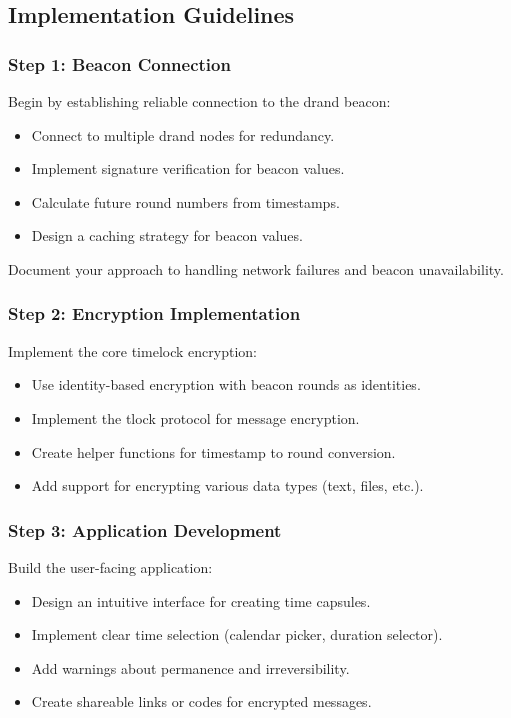 \documentclass[10pt,a4paper,american]{exam}
\begin{document}
\subsection*{Implementation Guidelines}

\subsubsection*{Step 1: Beacon Connection}
Begin by establishing reliable connection to the drand beacon:
\begin{itemize}
	\item Connect to multiple drand nodes for redundancy.
	\item Implement signature verification for beacon values.
	\item Calculate future round numbers from timestamps.
	\item Design a caching strategy for beacon values.
\end{itemize}

Document your approach to handling network failures and beacon unavailability.

\subsubsection*{Step 2: Encryption Implementation}
Implement the core timelock encryption:
\begin{itemize}
	\item Use identity-based encryption with beacon rounds as identities.
	\item Implement the tlock protocol for message encryption.
	\item Create helper functions for timestamp to round conversion.
	\item Add support for encrypting various data types (text, files, etc.).
\end{itemize}

\subsubsection*{Step 3: Application Development}
Build the user-facing application:
\begin{itemize}
	\item Design an intuitive interface for creating time capsules.
	\item Implement clear time selection (calendar picker, duration selector).
	\item Add warnings about permanence and irreversibility.
	\item Create shareable links or codes for encrypted messages.
\end{itemize}
\end{document}
